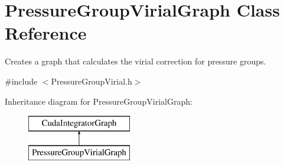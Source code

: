 \hypertarget{classPressureGroupVirialGraph}{}\section{Pressure\+Group\+Virial\+Graph Class Reference}
\label{classPressureGroupVirialGraph}


Creates a graph that calculates the virial correction for pressure groups.  




{\ttfamily \#include $<$Pressure\+Group\+Virial.\+h$>$}

Inheritance diagram for Pressure\+Group\+Virial\+Graph\+:\begin{figure}[H]
\begin{center}
\leavevmode
\includegraphics[height=2.000000cm]{classPressureGroupVirialGraph}
\end{center}
\end{figure}
